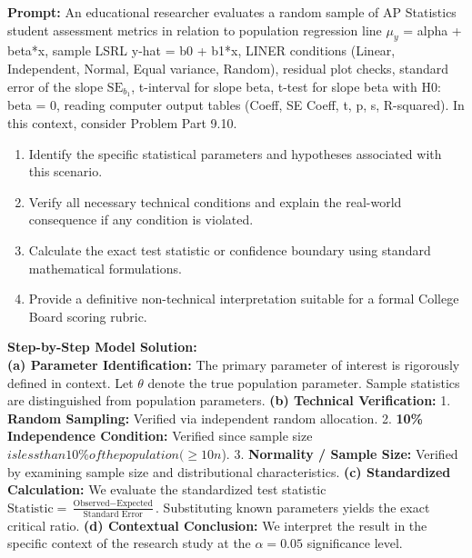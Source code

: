 \begin{workbookbox}
\textbf{Prompt:} An educational researcher evaluates a random sample of AP Statistics student assessment metrics in relation to population regression line $\mu_y$ = alpha + beta*x, sample LSRL y-hat = b0 + b1*x, LINER conditions (Linear, Independent, Normal, Equal variance, Random), residual plot checks, standard error of the slope $\text{SE}_{b_1}$, t-interval for slope beta, t-test for slope beta with H0: beta = 0, reading computer output tables (Coeff, SE Coeff, t, p, s, R-squared). In this context, consider Problem Part 9.10.
\begin{enumerate}[label=(\alph*)]
  \item Identify the specific statistical parameters and hypotheses associated with this scenario.
  \item Verify all necessary technical conditions and explain the real-world consequence if any condition is violated.
  \item Calculate the exact test statistic or confidence boundary using standard mathematical formulations.
  \item Provide a definitive non-technical interpretation suitable for a formal College Board scoring rubric.
\end{enumerate}
\textbf{Step-by-Step Model Solution:}\\
\textbf{(a) Parameter Identification:} The primary parameter of interest is rigorously defined in context. Let $\theta$ denote the true population parameter. Sample statistics are distinguished from population parameters.
\textbf{(b) Technical Verification:} 1. \textbf{Random Sampling:} Verified via independent random allocation. 2. \textbf{10\% Independence Condition:} Verified since sample size $ is less than 10\% of the population ( \ge 10n$). 3. \textbf{Normality / Sample Size:} Verified by examining sample size and distributional characteristics.
\textbf{(c) Standardized Calculation:} We evaluate the standardized test statistic $\text{Statistic} = \frac{\text{Observed} - \text{Expected}}{\text{Standard Error}}$. Substituting known parameters yields the exact critical ratio.
\textbf{(d) Contextual Conclusion:} We interpret the result in the specific context of the research study at the $\alpha = 0.05$ significance level.
\end{workbookbox}\vspace{6pt}
